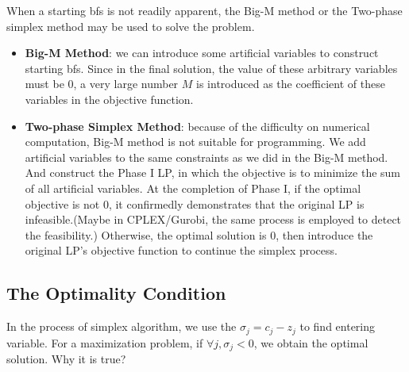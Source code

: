 \documentclass{article}
\begin{document}
When a starting bfs is not readily apparent, the Big-M method or the Two-phase simplex method may be used to solve the problem.
\begin{itemize}
	\item \textbf{Big-M Method}: we can introduce some artificial variables to construct starting bfs. Since in the final solution, the value of these arbitrary variables must be $0$, a very large number $M$ is introduced as the coefficient of these variables in the objective function. 
	\item \textbf{Two-phase Simplex Method}: because of the difficulty on numerical computation, Big-M method is not suitable for programming. We add artificial variables to the same constraints as we did in the Big-M method. And construct the Phase I LP, in which the objective is to minimize the sum of all artificial variables. At the completion of Phase I, if the optimal objective is not $0$, it confirmedly demonstrates that the original LP is infeasible.(Maybe in CPLEX/Gurobi, the same process is employed to detect the feasibility.) Otherwise, the optimal solution is $0$, then introduce the original LP's objective function to continue the simplex process.   
\end{itemize}

\subsection{The Optimality Condition}

In the process of simplex algorithm, we use the $\sigma_j = c_j - z_j$ to find entering variable. For a maximization problem, if $\forall j, \sigma_j <0$, we obtain the optimal solution. Why it is true? 
\end{document}
